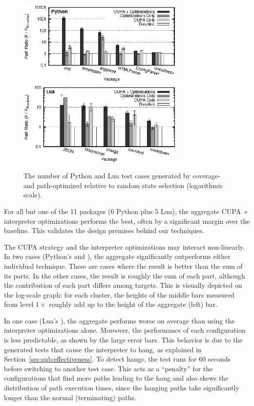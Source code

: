 \begin{figure}[t]
  \centering
  \includegraphics[width=3.27in]{figures/evaluation/bkdown-path-python} \\
  \includegraphics[width=3.27in]{figures/evaluation/bkdown-path-lua}
  \caption{The number of Python and Lua test cases generated by
    coverage- and path-optimized \cupa relative to random state
    selection (logarithmic scale).}
  \label{fig:tc-improv}
\end{figure}

For all but one of the 11 packages (6 Python plus 5 Lua), the aggregate CUPA + interpreter optimizations performs the best, often by a significant margin over the baseline.  This validates the design premises behind our techniques.

The CUPA strategy and the interpreter optimizations may interact non-linearly.  In two cases (Python's  and ), the aggregate significantly outperforms either individual technique. These are cases where the result is better than the sum of its parts.  In the other cases, the result is roughly the sum of each part, although the contribution of each part differs among targets.  This is visually depicted on the log-scale graph: for each cluster, the heights of the middle bars measured from level $1 \times$ roughly add up to the height of the aggregate (left) bar.

In one case (Lua's ), the aggregate performs worse on average than using the interpreter optimizations alone.  Moreover, the performance of each configuration is less predictable, as shown by the large error bars.  This behavior is due to the generated tests that cause the interpreter to hang, as explained in Section~\ref{sec:sub:effectiveness}.  To detect hangs, the test runs for 60 seconds before switching to another test case.  This acts as a ``penalty'' for the configurations that find more paths leading to the hang and also skews the distribution of path execution times, since the hanging paths take significantly longer than the normal (terminating) paths.

